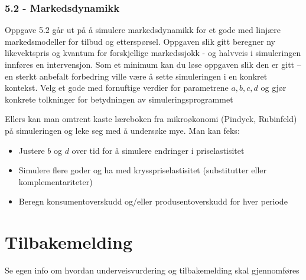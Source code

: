 \documentclass[12pt, titlepage]{article}
\begin{document}
\subsubsection*{5.2 - Markedsdynamikk}

Oppgave 5.2 går ut på å simulere markedsdynamikk for et gode med linjære markedsmodeller for tilbud og etterspørsel.
Oppgaven slik gitt beregner ny likevektspris og kvantum for forskjellige markedssjokk - og halvveis i simuleringen innføres en intervensjon.
Som et minimum kan du løse oppgaven slik den er gitt -- en sterkt anbefalt forbedring ville være å sette simuleringen i en konkret kontekst.
Velg et gode med fornuftige verdier for parametrene $a,b,c,d$ og gjør konkrete tolkninger for betydningen av simuleringsprogrammet

Ellers kan man omtrent kaste læreboken fra mikroøkonomi (Pindyck, Rubinfeld) på simuleringen og leke seg med å undersøke mye.
Man kan feks:
\begin{itemize}
   \item {Justere $b$ og $d$ over tid for å simulere endringer i priselastisitet}
   \item {Simulere flere goder og ha med krysspriselastisitet (substitutter eller komplementariteter)}
   \item {Beregn konsumentoverskudd og/eller produsentoverskudd for hver periode}
\end{itemize}

\section*{Tilbakemelding}

Se egen info om hvordan underveisvurdering og tilbakemelding skal gjennomføres
\end{document}
